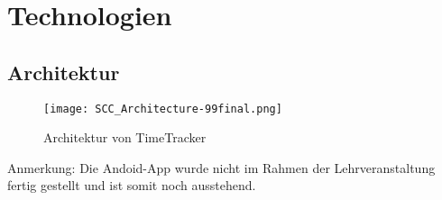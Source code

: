 

\section{Technologien}


\subsection{Architektur}


\begin{figure}[H]
	\hspace{-1.5cm}
	\texttt{[image: SCC\_Architecture-99final.png]}
	\caption{Architektur von TimeTracker}
	\label{fig:Architektur}
\end{figure}

Anmerkung: Die Andoid-App wurde nicht im Rahmen der Lehrveranstaltung fertig gestellt und ist somit noch ausstehend. 

